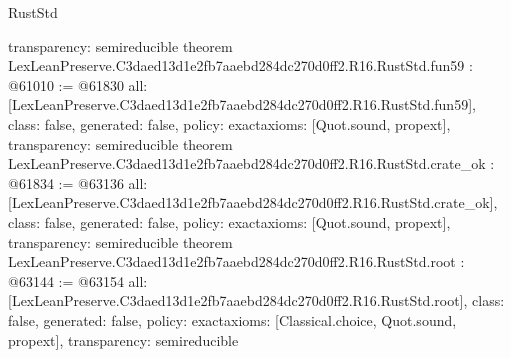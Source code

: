 \begin{lexlean}{RustStd}
\begin{coremodule}
{  transparency: semireducible
}
theorem LexLeanPreserve.C3daed13d1e2fb7aaebd284dc270d0ff2.R16.RustStd.fun59 : @61010 := @61830 {
  all: [LexLeanPreserve.C3daed13d1e2fb7aaebd284dc270d0ff2.R16.RustStd.fun59],
  class: false,
  generated: false,
  policy: exact{axioms: [Quot.sound, propext]},
  transparency: semireducible
}
theorem LexLeanPreserve.C3daed13d1e2fb7aaebd284dc270d0ff2.R16.RustStd.crate_ok : @61834 := @63136 {
  all: [LexLeanPreserve.C3daed13d1e2fb7aaebd284dc270d0ff2.R16.RustStd.crate_ok],
  class: false,
  generated: false,
  policy: exact{axioms: [Quot.sound, propext]},
  transparency: semireducible
}
theorem LexLeanPreserve.C3daed13d1e2fb7aaebd284dc270d0ff2.R16.RustStd.root : @63144 := @63154 {
  all: [LexLeanPreserve.C3daed13d1e2fb7aaebd284dc270d0ff2.R16.RustStd.root],
  class: false,
  generated: false,
  policy: exact{axioms: [Classical.choice, Quot.sound, propext]},
  transparency: semireducible
}


\end{coremodule}
\end{lexlean}
